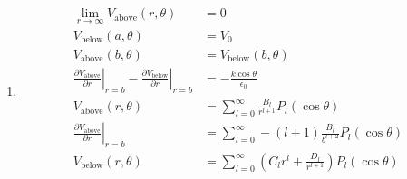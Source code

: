 \documentclass{article}
\begin{document}
\setcounter{subsection}{42}
\subsection{}

\begin{enumerate}
  \item

        \begin{align*}
          \lim_{r \rightarrow \infty} V_\text{above}(r, \theta)                                                                                 & = 0                                                                                                                                    \\
          V_\text{below}(a, \theta)                                                                                                             & = V_0                                                                                                                                  \\
          V_\text{above}(b, \theta)                                                                                                             & = V_\text{below}(b, \theta)                                                                                                            \\
          \left. \frac{\partial V_\text{above}}{\partial r} \right|_{r = b} - \left. \frac{\partial V_\text{below}}{\partial r} \right|_{r = b} & = -\frac{k \cos \theta}{\epsilon_0}                                                                                                    \\
          V_\text{above}(r, \theta)                                                                                                             & = \sum_{l = 0}^\infty \frac{B_l}{r^{l + 1}} P_l(\cos \theta)                                                                           \\
          \left. \frac{\partial V_\text{above}}{\partial r} \right|_{r = b}                                                                     & = \sum_{l = 0}^\infty -(l + 1) \frac{B_l}{b^{l + 2}} P_l(\cos \theta)                                                                  \\
          V_\text{below}(r, \theta)                                                                                                             & = \sum_{l = 0}^\infty \left( C_l r^l + \frac{D_l}{r^{l + 1}} \right) P_l(\cos \theta)                                                  \\

\end{align*}
\end{enumerate}
\end{document}
